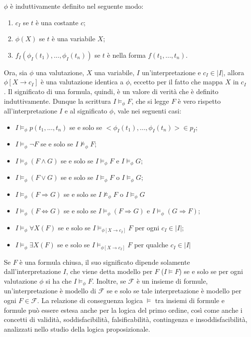 \noindent \(\phi\) è induttivamente definito nel seguente modo:
\begin{enumerate}
  \item \(c_I\) se \(t\) è una costante \(c\);
  \item \(\phi(X)\) se \(t\) è una variabile \(X\);
  \item \(f_I(\phi_I(t_1),...,\phi_I(t_n))\) se \(t\) è nella forma \(f(t_1,...,t_n)\).
\end{enumerate}
Ora, sia \(\phi\) una valutazione, \(X\) una variabile, \(I\) un'interpretazione e \(c_I\in |I|\), allora \(\phi[X\to c_I]\) è una valutazione identica a \(\phi\), eccetto per il fatto che mappa \(X\) in \(c_I\). Il significato di una formula, quindi, è un valore di verità che è definito induttivamente. Dunque la scrittura \(I \vDash_\phi F\), che si legge \(F\) è vero rispetto all'interpretazione \(I\) e al significato \(\phi\), vale nei seguenti casi:
\begin{itemize}
  \item \(I \vDash_\phi p(t_1,...,t_n)\) se e solo se \(<\phi_I(t_1),..., \phi_I(t_n)>\in p_I\);
  \item \(I \vDash_\phi \lnot F\) se e solo se \(I\nvDash_\phi F\);
  \item \(I \vDash_\phi (F\wedge G)\) se e solo se \(I \vDash_\phi F\) e \(I \vDash_\phi G\);
  \item \(I \vDash_\phi (F \vee G)\) se e solo se \(I \vDash_\phi F\) o \(I \vDash_\phi G\);
  \item \(I \vDash_\phi (F \Rightarrow G)\) se e solo se \(I\nvDash_\phi F\) o \(I\vDash_\phi G\)
  \item \(I \vDash_\phi (F \Leftrightarrow G)\) se e solo se \(I \vDash_\phi (F \Rightarrow G)\) e \(I\vDash_\phi (G \Rightarrow F)\);
  \item \(I\vDash_\phi\forall X(F)\) se e solo se \(I \vDash_{\phi[X\to c_I]} F\) per ogni \(c_I\in |I|\);
  \item \(I\vDash_\phi\exists X(F)\) se e solo se \(I \vDash_{\phi[X\to c_I]} F\) per qualche \(c_I\in |I|\)
\end{itemize}

Se \(F\) è una formula chiusa, il suo significato dipende solamente dall'interpretazione \(I\), che viene detta modello per \(F\) (\(I\vDash F\)) se e solo se per ogni valutazione \(\phi\) si ha che \(I\vDash_\phi F\). Inoltre, se \(\mathcal F\) è un insieme di formule, un'interpretazione è modello di \(\mathcal F\) se e solo se tale interpretazione è modello per ogni \(F \in \mathcal F\). La relazione di conseguenza logica \(\vDash\) tra insiemi di formule e formule può essere estesa anche per la logica del primo ordine, così come anche i concetti di validità, soddisfacibilità, falsificabilità, contingenza e insoddisfacibilità, analizzati nello studio della logica proposizionale.  

